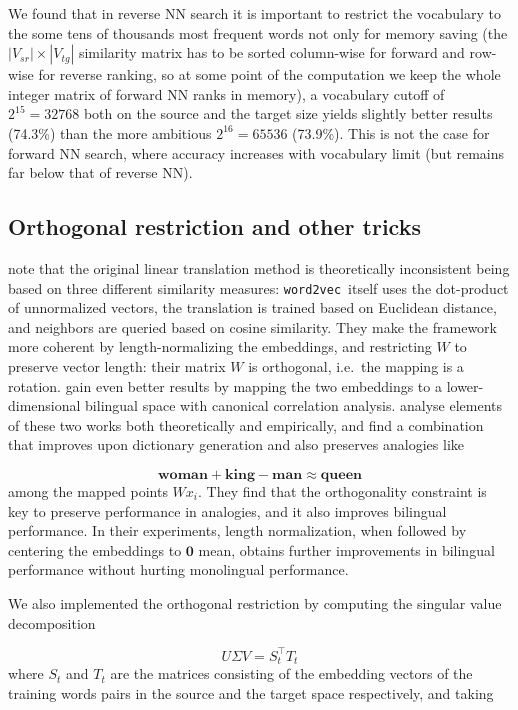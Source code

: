 \documentclass[11pt]{article}
\begin{document}
We found that in reverse NN search it is important to restrict the vocabulary to
the some tens of thousands most frequent words not only for memory saving (the
$|V_{sr}|\times|V_{tg}|$ similarity matrix has to be sorted column-wise for
forward and row-wise for reverse ranking, so at some point of the computation
we keep the whole integer matrix of forward NN ranks in memory), a vocabulary
cutoff of $2^{15}=32768$ both on the source and the target size yields slightly
better results (74.3\%) than the more ambitious $2^{16}=65536$ (73.9\%). This
is not the case for forward NN search, where accuracy increases with vocabulary
limit (but remains far below that of reverse NN).

\subsection{Orthogonal restriction and other tricks}

\newcommand{\wordtovec}{\texttt{word2vec}}

\cite{Xing:2015} note that the original linear translation method is
theoretically inconsistent being based on three different similarity measures:
\wordtovec~itself uses the dot-product of unnormalized vectors, the translation
is trained based on Euclidean distance, and neighbors are queried based on
cosine similarity. They make the framework more coherent by length-normalizing
the embeddings, and restricting $W$ to preserve vector length: their matrix
$W$ is orthogonal, i.e.~the mapping is a rotation.  \cite{Faruqui:2014} gain
even better results by mapping the two embeddings to a lower-dimensional
bilingual space with canonical correlation analysis.  \cite{Artetxe:2016}
analyse elements of these two works both theoretically and empirically, and
find a combination that improves upon dictionary generation and also preserves
analogies \citep{Mikolov:2013l} like

\[\mathbf{woman} + \mathbf{king}- \mathbf{man}  \approx \mathbf{queen}\]
among the mapped points $Wx_i$. They find that the
orthogonality constraint is key to preserve performance in analogies, and it
also improves bilingual performance.  In their experiments, length
normalization, when followed by centering the embeddings to $\mathbf 0$ mean,
obtains further improvements in bilingual performance without hurting
monolingual performance.

We also implemented the orthogonal restriction by computing the singular value
decomposition

\[U\Sigma V=S_t^\top T_t\] where $S_t$ and $T_t$ are the matrices consisting of
the embedding vectors of
the training words pairs in the source and the target space respectively, and
taking
\end{document}
